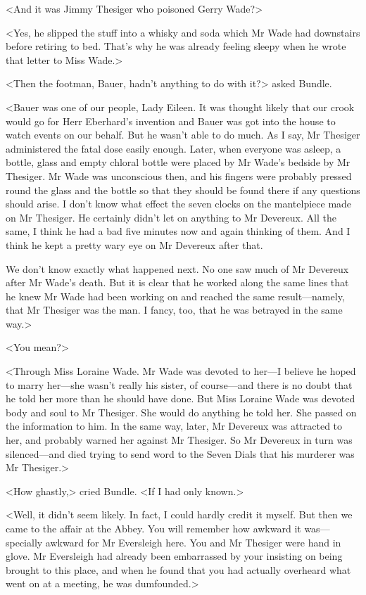<And it was Jimmy Thesiger who poisoned Gerry Wade?>

<Yes, he slipped the stuff into a whisky and soda which Mr Wade had downstairs before retiring to bed. That's why he was already feeling sleepy when he wrote that letter to Miss Wade.>

<Then the footman, Bauer, hadn't anything to do with it?> asked Bundle.

<Bauer was one of our people, Lady Eileen. It was thought likely that our crook would go for Herr Eberhard's invention and Bauer was got into the house to watch events on our behalf. But he wasn't able to do much. As I say, Mr Thesiger administered the fatal dose easily enough. Later, when everyone was asleep, a bottle, glass and empty chloral bottle were placed by Mr Wade's bedside by Mr Thesiger. Mr Wade was unconscious then, and his fingers were probably pressed round the glass and the bottle so that they should be found there if any questions should arise. I don't know what effect the seven clocks on the mantelpiece made on Mr Thesiger. He certainly didn't let on anything to Mr Devereux. All the same, I think he had a bad five minutes now and again thinking of them. And I think he kept a pretty wary eye on Mr Devereux after that.

We don't know exactly what happened next. No one saw much of Mr Devereux after Mr Wade's death. But it is clear that he worked along the same lines that he knew Mr Wade had been working on and reached the same result—namely, that Mr Thesiger was the man. I fancy, too, that he was betrayed in the same way.>

<You mean?>

<Through Miss Loraine Wade. Mr Wade was devoted to her—I believe he hoped to marry her—she wasn't really his sister, of course—and there is no doubt that he told her more than he should have done. But Miss Loraine Wade was devoted body and soul to Mr Thesiger. She would do anything he told her. She passed on the information to him. In the same way, later, Mr Devereux was attracted to her, and probably warned her against Mr Thesiger. So Mr Devereux in turn was silenced—and died trying to send word to the Seven Dials that his murderer was Mr Thesiger.>

<How ghastly,> cried Bundle. <If I had only known.>

<Well, it didn't seem likely. In fact, I could hardly credit it myself. But then we came to the affair at the Abbey. You will remember how awkward it was—specially awkward for Mr Eversleigh here. You and Mr Thesiger were hand in glove. Mr Eversleigh had already been embarrassed by your insisting on being brought to this place, and when he found that you had actually overheard what went on at a meeting, he was dumfounded.>

